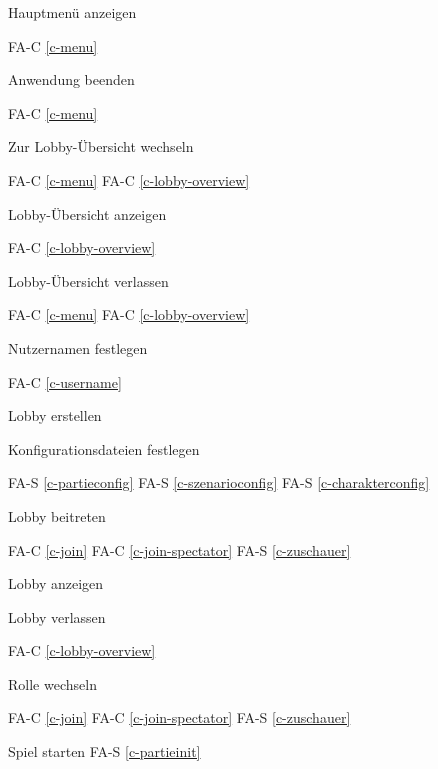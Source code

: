 Hauptmenü anzeigen

FA-C \ref{c-menu} %

Anwendung beenden

FA-C \ref{c-menu} %

Zur Lobby-Übersicht wechseln

FA-C \ref{c-menu} %
FA-C \ref{c-lobby-overview} %

Lobby-Übersicht anzeigen

FA-C \ref{c-lobby-overview} %

Lobby-Übersicht verlassen

FA-C \ref{c-menu} %
FA-C \ref{c-lobby-overview} %

Nutzernamen festlegen

FA-C \ref{c-username} %

Lobby erstellen

Konfigurationsdateien festlegen

FA-S \ref{c-partieconfig} %
FA-S \ref{c-szenarioconfig} %
FA-S \ref{c-charakterconfig} %

Lobby beitreten

FA-C \ref{c-join} %
FA-C \ref{c-join-spectator} %
FA-S \ref{c-zuschauer} %

Lobby anzeigen

Lobby verlassen

FA-C \ref{c-lobby-overview} %

Rolle wechseln

FA-C \ref{c-join} %
FA-C \ref{c-join-spectator} %
FA-S \ref{c-zuschauer} %

Spiel starten
FA-S \ref{c-partieinit} %


